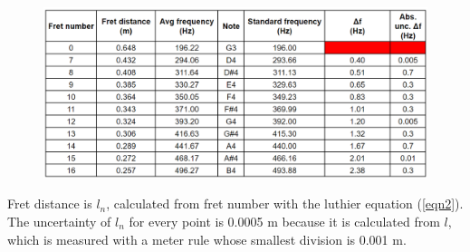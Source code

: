\begin{figure}[!htb]
    \includegraphics[width = \textwidth]{./ee/processed_table.png}
\end{figure}
\FloatBarrier
Fret distance is $l_n$, calculated from fret number with the luthier equation (\ref{eqn2}). The uncertainty of $l_n$ for every point is 0.0005 m because it is calculated from $l$, which is measured with a meter rule whose smallest division is 0.001 m.